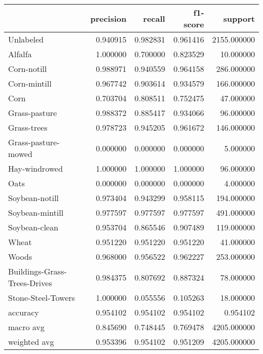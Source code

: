 \begin{tabular}{lrrrr}
\toprule
{} &  precision &    recall &  f1-score &      support \\
\midrule
Unlabeled                    &   0.940915 &  0.982831 &  0.961416 &  2155.000000 \\
Alfalfa                      &   1.000000 &  0.700000 &  0.823529 &    10.000000 \\
Corn-notill                  &   0.988971 &  0.940559 &  0.964158 &   286.000000 \\
Corn-mintill                 &   0.967742 &  0.903614 &  0.934579 &   166.000000 \\
Corn                         &   0.703704 &  0.808511 &  0.752475 &    47.000000 \\
Grass-pasture                &   0.988372 &  0.885417 &  0.934066 &    96.000000 \\
Grass-trees                  &   0.978723 &  0.945205 &  0.961672 &   146.000000 \\
Grass-pasture-mowed          &   0.000000 &  0.000000 &  0.000000 &     5.000000 \\
Hay-windrowed                &   1.000000 &  1.000000 &  1.000000 &    96.000000 \\
Oats                         &   0.000000 &  0.000000 &  0.000000 &     4.000000 \\
Soybean-notill               &   0.973404 &  0.943299 &  0.958115 &   194.000000 \\
Soybean-mintill              &   0.977597 &  0.977597 &  0.977597 &   491.000000 \\
Soybean-clean                &   0.953704 &  0.865546 &  0.907489 &   119.000000 \\
Wheat                        &   0.951220 &  0.951220 &  0.951220 &    41.000000 \\
Woods                        &   0.968000 &  0.956522 &  0.962227 &   253.000000 \\
Buildings-Grass-Trees-Drives &   0.984375 &  0.807692 &  0.887324 &    78.000000 \\
Stone-Steel-Towers           &   1.000000 &  0.055556 &  0.105263 &    18.000000 \\
accuracy                     &   0.954102 &  0.954102 &  0.954102 &     0.954102 \\
macro avg                    &   0.845690 &  0.748445 &  0.769478 &  4205.000000 \\
weighted avg                 &   0.953396 &  0.954102 &  0.951209 &  4205.000000 \\
\bottomrule
\end{tabular}
